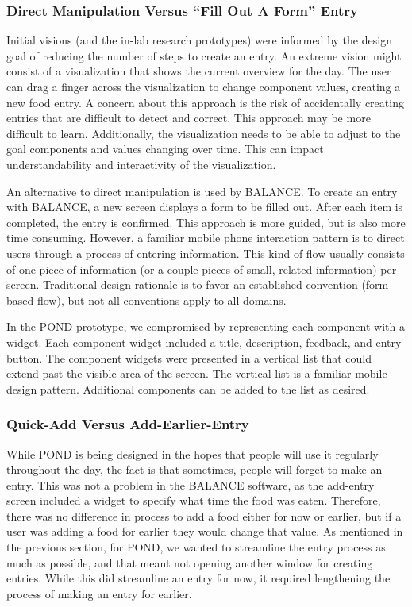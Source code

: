 \subsubsection{Direct Manipulation Versus ``Fill Out A Form'' Entry}
Initial visions (and the in-lab research prototypes) were informed by the design goal of reducing the number of steps to create an entry. An extreme vision might consist of a visualization that shows the current overview for the day. The user can drag a finger across the visualization to change component values, creating a new food entry. A concern about this approach is the risk of accidentally creating entries that are difficult to detect and correct.  This approach may be more difficult to learn. Additionally, the visualization needs to be able to adjust to the goal components and values changing over time. This can impact understandability and interactivity of the visualization. 

An alternative to direct manipulation is used by BALANCE. To create an entry with BALANCE, a new screen displays a form to be filled out. After each item is completed, the entry is confirmed. This approach is more guided, but is also more time consuming. However, a familiar mobile phone interaction pattern is to direct users through a process of entering information. This kind of flow usually consists of one piece of information (or a couple pieces of small, related information) per screen. Traditional design rationale is to favor an established convention (form-based flow), but not all conventions apply to all domains. 

In the POND prototype, we compromised by representing each component with a widget. Each component widget included a title, description, feedback, and entry button. The component widgets were presented in a vertical list that could extend past the visible area of the screen. The vertical list is a familiar mobile design pattern. Additional components can be added to the list as desired. 

\subsubsection{Quick-Add Versus Add-Earlier-Entry}

While POND is being designed in the hopes that people will use it regularly throughout the day, the fact is that sometimes, people will forget to make an entry. This was not a problem in the BALANCE software, as the add-entry screen included a widget to specify what time the food was eaten. Therefore, there was no difference in process to add a food either for now or earlier, but if a user was adding a food for earlier they would change that value. As mentioned in the previous section, for POND, we wanted to streamline the entry process as much as possible, and that meant not opening another window for creating entries. While this did streamline an entry for now, it required lengthening the process of making an entry for earlier. 

